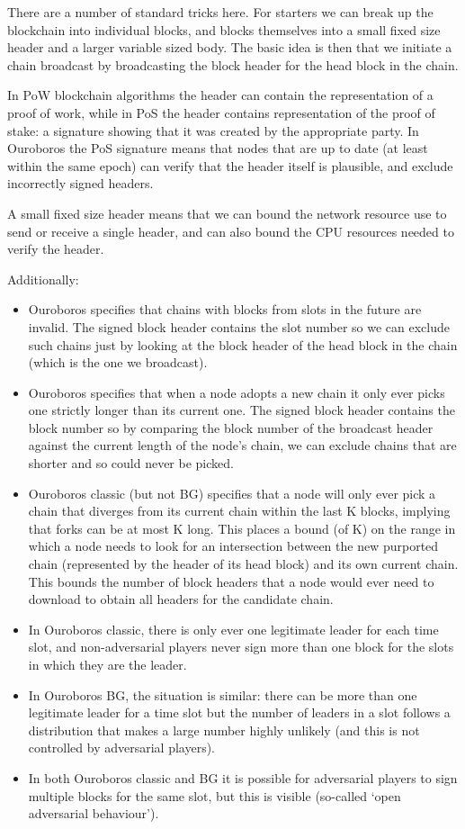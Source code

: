 \documentclass{article}
\theoremstyle{definition}{
  \newtheorem{lemma}{Lemma}[section] %
  \newtheorem{definition}[lemma]{Definition}
}
\theoremstyle{theorem}{
  \newtheorem{invariant}[lemma]{Invariant}
  \newtheorem{proofobligation}[lemma]{Proof Obligation}
}
\numberwithin{equation}{lemma}
\begin{document}
There are a number of standard tricks here. For starters we can break up the
blockchain into individual blocks, and blocks themselves into a small fixed
size header and a larger variable sized body. The basic idea is then that we
initiate a chain broadcast by broadcasting the block header for the head block
in the chain.

In PoW blockchain algorithms the header can contain the representation of a
proof of work, while in PoS the header contains representation of the proof of
stake: a signature showing that it was created by the appropriate party. In
Ouroboros the PoS signature means that nodes that are up to date (at least
within the same epoch) can verify that the header itself is plausible, and
exclude incorrectly signed headers.

A small fixed size header means that we can bound the network resource use
to send or receive a single header, and can also bound the CPU resources needed
to verify the header.

Additionally:
\begin{itemize}
\item Ouroboros specifies that chains with blocks from slots in the future are
      invalid. The signed block header contains the slot number so we can
      exclude such chains just by looking at the block header of the head block
      in the chain (which is the one we broadcast).
\item Ouroboros specifies that when a node adopts a new chain it only ever
      picks one strictly longer than its current one. The signed block header
      contains the block number so by comparing the block number of the
      broadcast header against the current length of the node's chain, we can
      exclude chains that are shorter and so could never be picked.
\item Ouroboros classic (but not BG) specifies that a node will only ever pick
      a chain that diverges from its current chain within the last K blocks,
      implying that forks can be at most K long. This places a bound (of K) on
      the range in which a node needs to look for an intersection between the
      new purported chain (represented by the header of its head block) and its
      own current chain. This bounds the number of block headers that a node
      would ever need to download to obtain all headers for the candidate chain.
\item In Ouroboros classic, there is only ever one legitimate leader for each
      time slot, and non-adversarial players never sign more than one block
      for the slots in which they are the leader.
\item In Ouroboros BG, the situation is similar: there can be more than one
      legitimate leader for a time slot but the number of leaders in a slot
      follows a distribution that makes a large number highly unlikely (and
      this is not controlled by adversarial players).
\item In both Ouroboros classic and BG it is possible for adversarial players
      to sign multiple blocks for the same slot, but this is visible (so-called
      `open adversarial behaviour').
\end{itemize}
\end{document}
